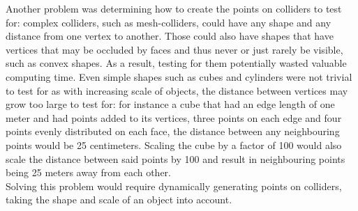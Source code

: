 Another problem was determining how to create the points on colliders to test for: complex colliders, such as mesh-colliders, could have any shape and any distance from one vertex to another. Those could also have shapes that have vertices that may be occluded by faces and thus never or just rarely be visible, such as convex shapes. As a result, testing for them potentially wasted valuable computing time. Even simple shapes such as cubes and cylinders were not trivial to test for as with increasing scale of objects, the distance between vertices may grow too large to test for: for instance a cube that had an edge length of one meter and had points added to its vertices, three points on each edge and four points evenly distributed on each face, the distance between any neighbouring points would be 25 centimeters. Scaling the cube by a factor of 100 would also scale the distance between said points by 100 and result in neighbouring points being 25 meters away from each other.\\
Solving this problem would require dynamically generating points on colliders, taking the shape and scale of an object into account.

